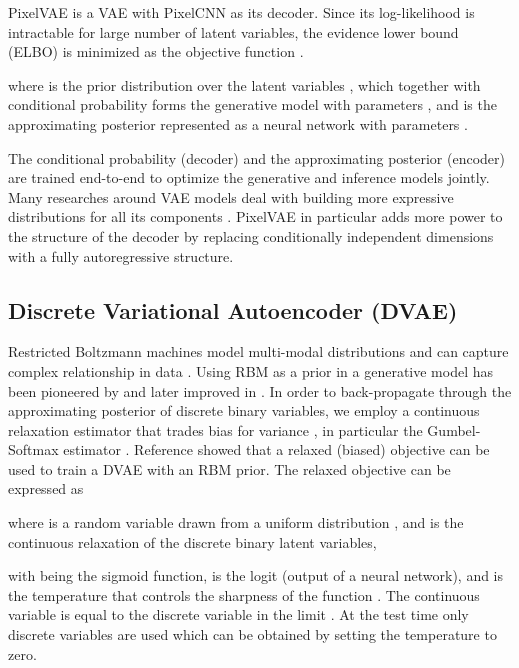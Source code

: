 \documentclass{article}
\begin{document}
PixelVAE \cite{gulrajani2016pixelvae} is a VAE with PixelCNN as its decoder. Since its log-likelihood is intractable for large number of latent variables, the evidence lower bound (ELBO) is minimized as the objective function \cite{kingma2013auto}. 

where  is the prior distribution over the latent variables , which together with conditional probability  forms the generative model  with parameters , and  is the approximating posterior represented as a neural network with parameters . 

The conditional probability (decoder) and the approximating posterior (encoder) are trained end-to-end to optimize the generative and inference models jointly. Many researches around VAE models deal with building more expressive distributions for all its components \cite{kingma2016improved, tomczak2017vae, vahdat2018dvae++, gulrajani2016pixelvae, chen2016variational}. PixelVAE in particular adds more power to the structure of the decoder by replacing conditionally independent dimensions with a fully autoregressive structure. 


\subsection{Discrete Variational Autoencoder (DVAE)}
\label{DVAE}

Restricted Boltzmann machines model multi-modal distributions and can capture complex relationship in data \cite{le2008representational}. Using RBM as a prior in a generative model has been pioneered by \cite{rolfe2016discrete} and later improved in \cite{vahdat2018dvae++, vahdat2018dvae, vahdat2019learning, khoshaman2018gumbolt}. In order to back-propagate through the approximating posterior of discrete binary variables, we employ a continuous relaxation estimator that trades bias for variance \cite{bengio2013estimating, raiko2014techniques}, in particular the Gumbel-Softmax estimator \cite{jang2016categorical, maddison2016concrete}. Reference \cite{khoshaman2018gumbolt} showed that a relaxed (biased) objective can be used to train a DVAE with an RBM prior. The relaxed objective can be expressed as 

where  is a random variable drawn from a uniform distribution , and  is the continuous relaxation of the discrete binary latent variables, 

with  being the sigmoid function,  is the logit (output of a neural network), and  is the temperature that controls the sharpness of the function . The continuous variable  is equal to the discrete variable  in the limit . At the test time only discrete variables are used which can be obtained by setting the temperature to zero.
\end{document}
